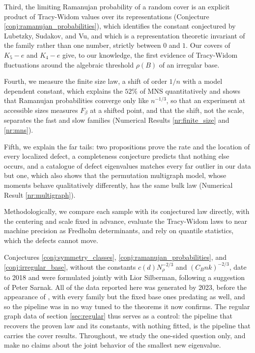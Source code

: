 \documentclass[12pt,oneside,english]{amsart}
\numberwithin{equation}{section}
\numberwithin{figure}{section}
\numberwithin{table}{section}
\theoremstyle{plain}
\numberwithin{thm}{section}
\theoremstyle{plain}
\theoremstyle{plain}
\theoremstyle{plain}
\theoremstyle{definition}
\theoremstyle{definition}
\theoremstyle{definition}
\theoremstyle{remark}
\begin{document}
Third, the limiting
Ramanujan probability of a random cover is an explicit product of
Tracy-Widom values over its representations (Conjecture \ref{conj:ramanujan_probabilities}),
which identifies the constant conjectured by Lubetzky, Sudakov, and
Vu, and which is a representation theoretic invariant of the family
rather than one number, strictly between $0$ and $1$. Our covers
of $K_{5}-e$ and $K_{4}-e$ give, to our knowledge, the first evidence
of Tracy-Widom fluctuations around the algebraic threshold $\rho(B)$
of an irregular base.

Fourth, we measure the finite size law, a shift
of order $1/n$ with a model dependent constant, which explains the
$52\%$ of MNS quantitatively and shows that Ramanujan probabilities
converge only like $n^{-1/3}$, so that an experiment at accessible
sizes measures $F_{\beta}$ at a shifted point, and that the shift,
not the scale, separates the fast and slow families (Numerical Results
\ref{nr:finite_size} and \ref{nr:mns}).

Fifth, we explain the far
tails: two propositions prove the rate and the location of every localized
defect, a completeness conjecture predicts that nothing else occurs,
and a catalogue of defect eigenvalues matches every far outlier in
our data but one, which also shows that the permutation multigraph
model, whose moments behave qualitatively differently, has the same bulk law (Numerical Result \ref{nr:multigraph}).

Methodologically,
we compare each sample with its conjectured law directly, with the
centering and scale fixed in advance, evaluate the Tracy-Widom laws
to near machine precision as Fredholm determinants, and rely on quantile
statistics, which the defects cannot move.

Conjectures \ref{conj:symmetry_classes}, \ref{conj:ramanujan_probabilities},
and \ref{conj:irregular_base}, without the constants $c(d)N_{\rho}^{-2/3}$
and $(C_{B}nk)^{-2/3}$, date to 2018 and were formulated jointly
with Lior Silberman, following a suggestion of Peter Sarnak. All of
the data reported here was generated by 2023, before the appearance
of \cite{HuangMcKenzieYau2024}, with every family but the fixed base
ones predating \cite{HuangYau2023} as well, and so the pipeline was
in no way tuned to the theorems it now confirms. %
The regular graph data of section \ref{sec:regular} thus serves
as a control: the pipeline that recovers the proven law and its constants,
with nothing fitted, is the pipeline that carries the cover results.
Throughout, we study the one-sided question only, and make no claims
about the joint behavior of the smallest new eigenvalue.
\end{document}
